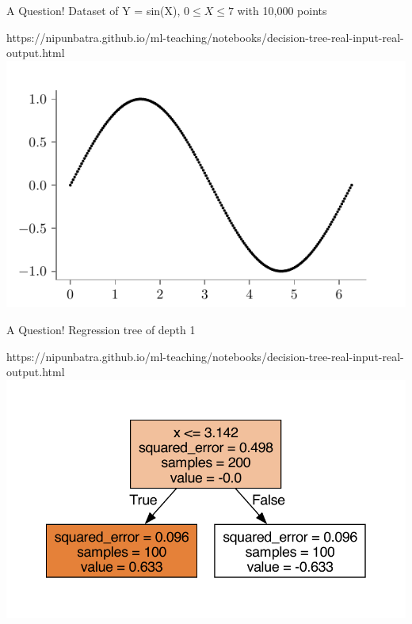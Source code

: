 \documentclass[usenames,dvipsnames]{beamer}
\begin{document}
\begin{frame}{A Question!}
Dataset of Y = sin(X), $0 \leq X \leq 7$ with 10,000 points 
\begin{center}
	\begin{notebookbox}{https://nipunbatra.github.io/ml-teaching/notebooks/decision-tree-real-input-real-output.html}
		\includegraphics{../assets/decision-trees/figures/sine-dataset.pdf}
	  \end{notebookbox}
\end{center}
\end{frame}

\begin{frame}{A Question!}
Regression tree of depth 1
\begin{center}
	\begin{notebookbox}{https://nipunbatra.github.io/ml-teaching/notebooks/decision-tree-real-input-real-output.html}
		\includegraphics[scale=0.6]{../assets/decision-trees/figures/sine-depth-1-sklearn.pdf}
	  \end{notebookbox}
\end{center}
\end{frame}
\end{document}
